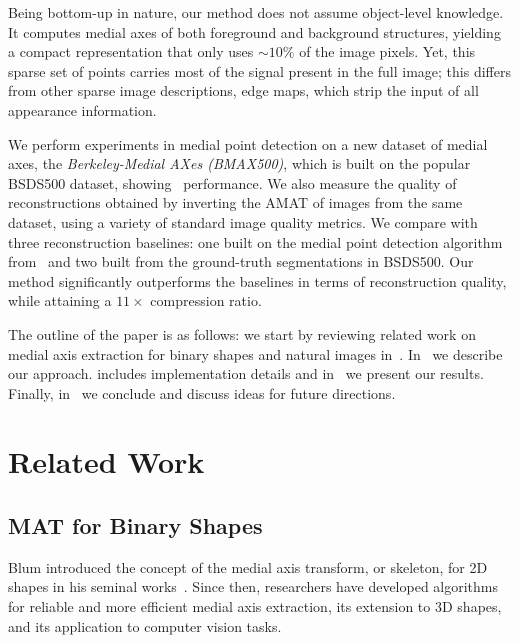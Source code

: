 \documentclass[10pt,twocolumn,letterpaper]{article}
\begin{document}
Being bottom-up in nature, our method does not assume object-level knowledge.
It computes medial axes of both foreground and background structures, 
yielding a compact representation that only uses $\sim 10\%$ of the image pixels.
Yet, this sparse set of points carries most of the signal present in the full image;
this differs from other sparse image descriptions, \eg edge maps, which strip the input of all appearance information.

We perform experiments in medial point detection on a new dataset of medial axes, the 
\emph{Berkeley-Medial AXes (BMAX500)}, which is built on the popular BSDS500 dataset, showing \sota\ performance.
We also measure the quality of reconstructions  obtained by inverting the AMAT of images from the same dataset, 
using  a variety of standard image quality metrics.
We compare with three reconstruction baselines: one built on the medial point detection algorithm from~\cite{tsogkas2012learning}
and two built from the ground-truth segmentations in BSDS500.
Our method significantly outperforms the baselines in terms of reconstruction quality, while attaining a $11\times$ compression ratio.

The outline of the paper is as follows: we start by reviewing related work on medial axis extraction for binary shapes
and natural images in~.
In~ we describe our approach.
 includes implementation details and in~ we present our results.
Finally, in~ we conclude and discuss ideas for future directions.


\section{Related Work}\label{sec:related}
\subsection{MAT for Binary Shapes}\label{sec:related:binary}
Blum introduced the concept of the medial axis transform, or skeleton, for 2D shapes
in his seminal works~\cite{blum1967transformation,blum1973biological}.
Since then, researchers have developed algorithms for reliable
and more efficient medial axis extraction, its extension to 3D shapes, and its application
to computer vision tasks.
\end{document}
